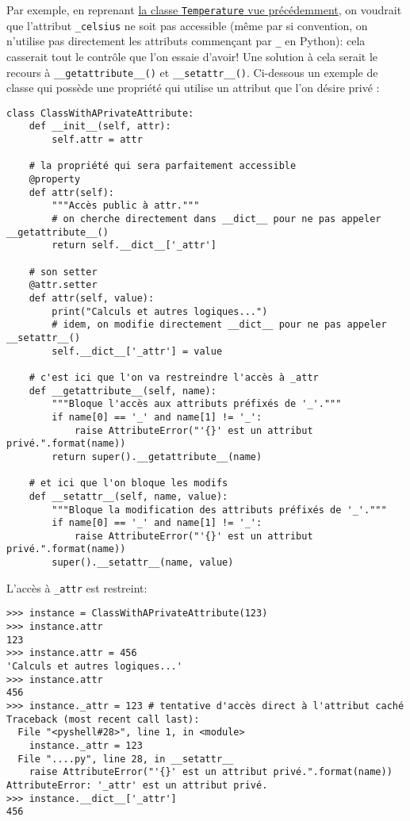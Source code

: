 Par exemple, en reprenant \hyperref[sec:proprietes]{la classe \texttt{Temperature} vue précédemment}, on voudrait que l'attribut \texttt{_celsius} ne soit pas accessible (même par si convention, on n'utilise pas directement les attributs commençant par \texttt{_} en Python): cela casserait tout le contrôle que l'on essaie d'avoir! Une solution à cela serait le recours à \texttt{__getattribute__()} et \texttt{__setattr__()}. Ci-dessous un exemple de classe qui possède
une propriété qui utilise un attribut que l'on désire \og privé \fg{}:
\begin{verbatim}
class ClassWithAPrivateAttribute:
    def __init__(self, attr):
        self.attr = attr
    
    # la propriété qui sera parfaitement accessible
    @property
    def attr(self):
        """Accès public à attr."""
        # on cherche directement dans __dict__ pour ne pas appeler __getattribute__()
        return self.__dict__['_attr']
    
    # son setter
    @attr.setter
    def attr(self, value):
        print("Calculs et autres logiques...")
        # idem, on modifie directement __dict__ pour ne pas appeler __setattr__()
        self.__dict__['_attr'] = value
    
    # c'est ici que l'on va restreindre l'accès à _attr
    def __getattribute__(self, name):
        """Bloque l'accès aux attributs préfixés de '_'."""
        if name[0] == '_' and name[1] != '_':
            raise AttributeError("'{}' est un attribut privé.".format(name))
        return super().__getattribute__(name)
    
    # et ici que l'on bloque les modifs
    def __setattr__(self, name, value):
        """Bloque la modification des attributs préfixés de '_'."""
        if name[0] == '_' and name[1] != '_':
            raise AttributeError("'{}' est un attribut privé.".format(name))
        super().__setattr__(name, value)
\end{verbatim}

L'accès à \texttt{_attr} est restreint:
\begin{verbatim}
>>> instance = ClassWithAPrivateAttribute(123)
>>> instance.attr
123
>>> instance.attr = 456
'Calculs et autres logiques...'
>>> instance.attr
456
>>> instance._attr = 123 # tentative d'accès direct à l'attribut caché
Traceback (most recent call last):
  File "<pyshell#28>", line 1, in <module>
    instance._attr = 123
  File "....py", line 28, in __setattr__
    raise AttributeError("'{}' est un attribut privé.".format(name))
AttributeError: '_attr' est un attribut privé.
>>> instance.__dict__['_attr']
456
\end{verbatim}

